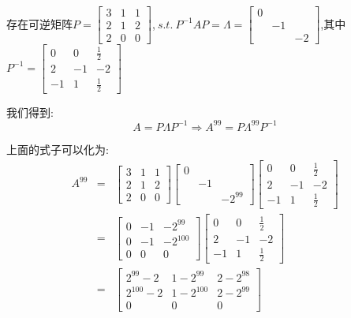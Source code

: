\begin{solution}
	存在可逆矩阵$P=\left[ \begin{matrix}
		3&1&1\\2&1&2\\2&0&0
	\end{matrix}\right]$,$\ s.t. \ P^{-1}AP=\varLambda=\left[ \begin{matrix}
		0& & \\ &-1& \\ & &-2
	\end{matrix}\right]$,其中$P^{-1}=\left[ \begin{matrix}
		0&0&\frac{1}{2}\\2&-1&-2\\-1&1&\frac{1}{2}
	\end{matrix}\right]$
	
	我们得到: $$A=P\varLambda P^{-1}\Rightarrow A^{99}=P\varLambda^{99}P^{-1}$$
	
	上面的式子可以化为: 
	\begin{eqnarray*}
		A^{99}&=&\left[ \begin{matrix}
			3&1&1\\2&1&2\\2&0&0
		\end{matrix}\right]\left[ \begin{matrix}
			0& & \\ &-1& \\ & &-2^{99}
		\end{matrix}\right]\left[ \begin{matrix}
			0&0&\frac{1}{2}\\2&-1&-2\\-1&1&\frac{1}{2}
		\end{matrix}\right]\\
		&=&\left[ \begin{matrix}
			0&-1&-2^{99}\\0&-1&-2^{100}\\0&0&0
		\end{matrix}\right]\left[ \begin{matrix}
			0&0&\frac{1}{2}\\2&-1&-2\\-1&1&\frac{1}{2}
		\end{matrix}\right]\\
		&=&\left[ \begin{matrix}
			2^{99}-2&1-2^{99}&2-2^{98}\\2^{100}-2&1-2^{100}&2-2^{99}\\0&0&0
		\end{matrix}\right]
	\end{eqnarray*}
\end{solution}

